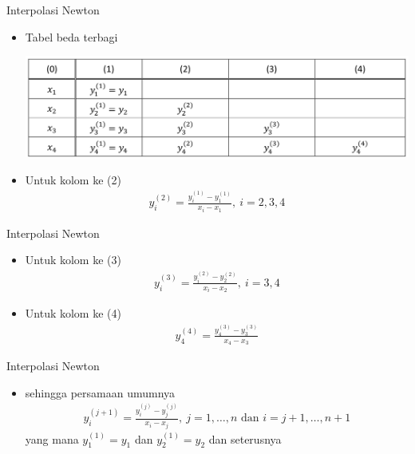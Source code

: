 \documentclass[pdflatex,compress]{beamer}
\begin{document}
\begin{frame}{Interpolasi Newton}
	\begin{itemize}
		\item Tabel beda terbagi
		\begin{center}
			\includegraphics[width=\linewidth]{img/img04}
		\end{center}
		\item Untuk kolom ke (2)
		\begin{align*}
			y_i^{(2)} = \frac{y_i^{(1)} - y_1^{(1)}}{x_i - x_1},~i = 2,3,4
		\end{align*}
	\end{itemize}
\end{frame}

\begin{frame}{Interpolasi Newton}
	\begin{itemize}
		\item Untuk kolom ke (3)
		\begin{align*}
			y_i^{(3)} = \frac{y_i^{(2)} - y_2^{(2)}}{x_i - x_2},~i = 3,4
		\end{align*}
		\item Untuk kolom ke (4)
		\begin{align*}
			y_4^{(4)} = \frac{y_4^{(3)} - y_3^{(3)}}{x_4 - x_3}
		\end{align*}
	\end{itemize}
\end{frame}

\begin{frame}{Interpolasi Newton}
	\begin{itemize}
		\item sehingga persamaan umumnya
		\begin{align*}
			y_i^{(j+1)} = \frac{y_i^{(j)} - y_j^{(j)}}{x_i - x_j},~j=1,\dots,n\text{ dan } i = j+1,\dots,n+1
		\end{align*}
		yang mana $ y_1^{(1)} = y_1 $ dan $ y_2^{(1)} = y_2 $ dan seterusnya
	\end{itemize}
\end{frame}
\end{document}

